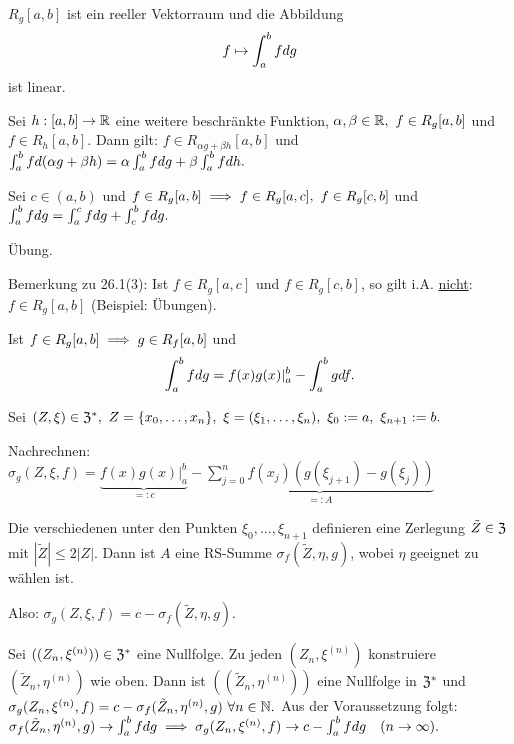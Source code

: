 \documentclass[a4paper,twoside,DIV15,BCOR12mm]{scrbook}
\begin{document}
\begin{satz}
\begin{liste}
\item $R_g[a,b]$ ist ein reeller Vektorraum und die Abbildung $$f \mapsto \intab* fdg$$ ist linear.
\item Sei $h:[a,b] \to \mathbb{R}$ eine weitere beschränkte Funktion, $\alpha,\beta \in \MdR,\ f \in R_g[a,b]$ und $f \in R_h[a,b]$. Dann gilt: $f \in R_{\alpha g + \beta h}[a,b]$ und $\intab* fd(\alpha g + \beta h) = \alpha \intab* fdg + \beta \intab* fdh.$
\item Sei $c \in (a,b)$ und $f \in R_g[a,b] \implies f \in R_g[a,c],\ f \in R_g[c,b]$ und $\intab* fdg = \int_a^c fdg + \int_c^b fdg.$
\end{liste}
\end{satz}

\begin{beweis}
Übung.
\end{beweis}

Bemerkung zu 26.1(3): Ist $f \in R_g[a,c]$ und $f \in R_g[c,b]$, so gilt i.A. \underline{nicht}: $f \in R_g[a,b]$ (Beispiel: Übungen).

\begin{satz}
Ist $f \in R_g[a,b] \implies g \in R_f[a,b]$ und $$\intab* fdg = f(x)g(x)|_a^b - \intab* gdf.$$
\end{satz}

\begin{beweis}
Sei $(Z,\xi) \in \mathfrak{Z}^*,\ Z = \{x_0,\ldots,x_n\},\ \xi = (\xi_1,\ldots,\xi_n),\ \xi_0 := a,\ \xi_{n+1} := b.$

Nachrechnen: $\sigma_g(Z,\xi,f) = \underbrace{f(x)g(x)|_a^b}_{=:c} - \underbrace{\sum_{j=0}^n f(x_j)(g(\xi_{j+1}) - g(\xi_j))}_{=:A}$

Die verschiedenen unter den Punkten $\xi_0,\ldots,\xi_{n+1}$ definieren eine Zerlegung $\tilde{Z} \in \mathfrak{Z}$ mit $|\tilde{Z}| \le 2|Z|$. Dann ist $A$ eine RS-Summe $\sigma_f(\tilde{Z},\eta,g)$, wobei $\eta$ geeignet zu wählen ist.

Also: $\sigma_g(Z,\xi,f) = c - \sigma_f(\tilde{Z},\eta,g).$

Sei $((Z_n,\xi^{(n)})) \in \mathfrak{Z}^*$ eine Nullfolge. Zu jeden $(Z_n,\xi^{(n)})$ konstruiere $(\tilde{Z}_n,\eta^{(n)})$ wie oben. Dann ist $((\tilde{Z}_n,\eta^{(n)}))$ eine Nullfolge in $\mathfrak{Z}^*$ und $\sigma_g(Z_n,\xi^{(n)},f) = c - \sigma_f(\tilde{Z}_n,\eta^{(n)},g)\ \forall n \in \mathbb{N}.$ Aus der Voraussetzung folgt: $\sigma_f(\tilde{Z}_n,\eta^{(n)},g) \to \intab* fdg \folgt \sigma_g(Z_n,\xi^{(n)},f) \to c - \intab* fdg\quad (n \to \infty).$
\end{beweis}
\end{document}
